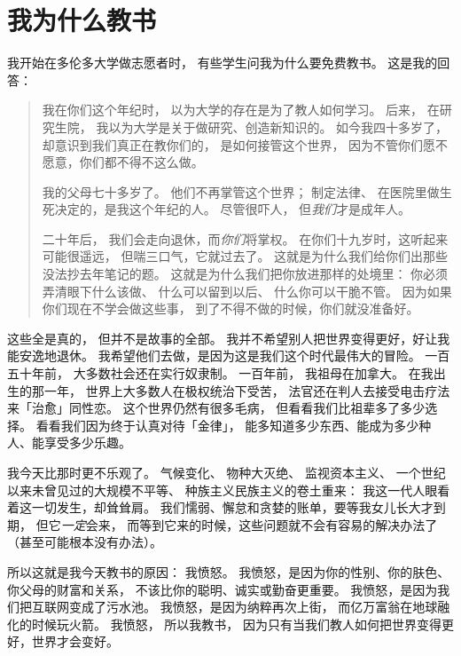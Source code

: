 \chapter{我为什么教书}\label{s:finale}

我开始在多伦多大学做志愿者时，
有些学生问我为什么要免费教书。
这是我的回答：

\begin{quote}

我在你们这个年纪时，
以为大学的存在是为了教人如何学习。
后来，
在研究生院，
我以为大学是关于做研究、创造新知识的。
如今我四十多岁了，
却意识到我们真正在教你们的，
是如何接管这个世界，
因为不管你们愿不愿意，你们都不得不这么做。

我的父母七十多岁了。
他们不再掌管这个世界；
制定法律、
在医院里做生死决定的，是我这个年纪的人。
尽管很吓人，
但\emph{我们}才是成年人。

二十年后，
我们会走向退休，而\emph{你们}将掌权。
在你们十九岁时，这听起来可能很遥远，
但喘三口气，它就过去了。
这就是为什么我们给你们出那些没法抄去年笔记的题。
这就是为什么我们把你放进那样的处境里：
你必须弄清眼下什么该做、
什么可以留到以后、
什么你可以干脆不管。
因为如果你们现在不学会做这些事，
到了不得不做的时候，你们就没准备好。

\end{quote}

这些全是真的，
但并不是故事的全部。
我并不希望别人把世界变得更好，好让我能安逸地退休。
我希望他们去做，是因为这是我们这个时代最伟大的冒险。
一百五十年前，
大多数社会还在实行奴隶制。
一百年前，
我祖母在加拿大。
在我出生的那一年，
世界上大多数人在极权统治下受苦，
法官还在判人去接受电击疗法来「治愈」同性恋。
这个世界仍然有很多毛病，
但看看我们比祖辈多了多少选择。
看看我们因为终于认真对待「金律」，
能多知道多少东西、能成为多少种人、能享受多少乐趣。

我今天比那时更不乐观了。
气候变化、
物种大灭绝、
监视资本主义、
一个世纪以来未曾见过的大规模不平等、
种族主义民族主义的卷土重来：
我这一代人眼看着这一切发生，却耸耸肩。
我们懦弱、懈怠和贪婪的账单，要等我女儿长大才到期，
但它\emph{一定}会来，
而等到它来的时候，这些问题就不会有容易的解决办法了
（甚至可能根本没有办法）。

所以这就是我今天教书的原因：
我愤怒。
我愤怒，是因为你的性别、你的肤色、你父母的财富和关系，
不该比你的聪明、诚实或勤奋更重要。
我愤怒，是因为我们把互联网变成了污水池。
我愤怒，是因为纳粹再次上街，
而亿万富翁在地球融化的时候玩火箭。
我愤怒，
所以我教书，
因为只有当我们教人如何把世界变得更好，世界才会变好。

